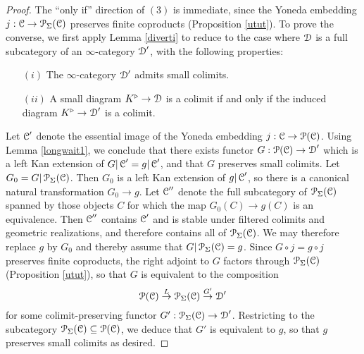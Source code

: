 \begin{proof}
The ``only if'' direction of $(3)$ is immediate, since the Yoneda embedding $j: \operatorname{\mathcal{C}} \rightarrow \operatorname{\mathcal{P}}_{\Sigma}(\operatorname{\mathcal{C}})$ preserves finite coproducts (Proposition \ref{utut}). To prove the converse,
we first apply Lemma \ref{diverti} to reduce to the case where $\operatorname{\mathcal{D}}$ is a full subcategory of an $\infty$-category $\operatorname{\mathcal{D}}'$, with the following properties:
\begin{itemize}
\item[$(i)$] The $\infty$-category $\operatorname{\mathcal{D}}'$ admits small colimits.
\item[$(ii)$] A small diagram $K^{\triangleright} \rightarrow \operatorname{\mathcal{D}}$ is a colimit if and only if the induced diagram $K^{\triangleright} \rightarrow \operatorname{\mathcal{D}}'$ is a colimit.
\end{itemize}
Let $\operatorname{\mathcal{C}}'$ denote the essential image of the Yoneda embedding $j: \operatorname{\mathcal{C}} \rightarrow \operatorname{\mathcal{P}}(\operatorname{\mathcal{C}})$.
Using Lemma \ref{longwait1}, we conclude that there exists functor $G: \operatorname{\mathcal{P}}(\operatorname{\mathcal{C}}) \rightarrow \operatorname{\mathcal{D}}'$ which is a left Kan extension of $G | \operatorname{\mathcal{C}}' = g | \operatorname{\mathcal{C}}'$, and that $G$ preserves small colimits. 
Let $G_0 = G | \operatorname{\mathcal{P}}_{\Sigma}(\operatorname{\mathcal{C}})$. Then $G_0$ is a left Kan extension of $g | \operatorname{\mathcal{C}}'$, so there
is a canonical natural transformation $G_0 \rightarrow g$. Let $\operatorname{\mathcal{C}}''$ denote the full subcategory
of $\operatorname{\mathcal{P}}_{\Sigma}(\operatorname{\mathcal{C}})$ spanned by those objects $C$ for which the map $G_0(C) \rightarrow g(C)$
is an equivalence. Then $\operatorname{\mathcal{C}}''$ contains $\operatorname{\mathcal{C}}'$ and is stable under filtered colimits and geometric realizations, and therefore contains all of $\operatorname{\mathcal{P}}_{\Sigma}(\operatorname{\mathcal{C}})$. We may therefore replace
$g$ by $G_0$ and thereby assume that $G | \operatorname{\mathcal{P}}_{\Sigma}(\operatorname{\mathcal{C}}) = g$.
Since $G \circ j = g \circ j$ preserves finite coproducts, the right adjoint to $G$ factors through
$\operatorname{\mathcal{P}}_{\Sigma}(\operatorname{\mathcal{C}})$ (Proposition \ref{utut}), so that $G$ is equivalent to the composition
$$ \operatorname{\mathcal{P}}(\operatorname{\mathcal{C}}) \stackrel{L}{\rightarrow} \operatorname{\mathcal{P}}_{\Sigma}(\operatorname{\mathcal{C}}) \stackrel{G'}{\rightarrow} \operatorname{\mathcal{D}}'$$
for some colimit-preserving functor $G': \operatorname{\mathcal{P}}_{\Sigma}(\operatorname{\mathcal{C}}) \rightarrow \operatorname{\mathcal{D}}'$. Restricting to
the subcategory $\operatorname{\mathcal{P}}_{\Sigma}(\operatorname{\mathcal{C}}) \subseteq \operatorname{\mathcal{P}}(\operatorname{\mathcal{C}})$, we deduce that
$G'$ is equivalent to $g$, so that $g$ preserves small colimits as desired.
\end{proof}

